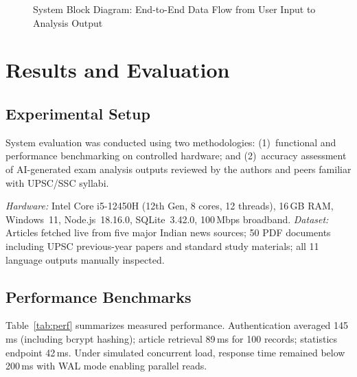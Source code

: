 \documentclass[conference]{IEEEtran}
\begin{document}
\begin{figure}[!t]
\caption{System Block Diagram: End-to-End Data Flow from User Input to Analysis Output}
\label{fig:blockdiagram}
\end{figure}

\section{Results and Evaluation}

\subsection{Experimental Setup}
System evaluation was conducted using two methodologies: (1)~functional and performance benchmarking on controlled hardware; and (2)~accuracy assessment of AI-generated exam analysis outputs reviewed by the authors and peers familiar with UPSC/SSC syllabi.

\textit{Hardware:} Intel Core i5-12450H (12th Gen, 8 cores, 12 threads), 16\,GB RAM, Windows~11, Node.js~18.16.0, SQLite~3.42.0, 100\,Mbps broadband. \textit{Dataset:} Articles fetched live from five major Indian news sources; 50 PDF documents including UPSC previous-year papers and standard study materials; all 11 language outputs manually inspected.

\subsection{Performance Benchmarks}
Table~\ref{tab:perf} summarizes measured performance. Authentication averaged 145\,ms (including bcrypt hashing); article retrieval 89\,ms for 100 records; statistics endpoint 42\,ms. Under simulated concurrent load, response time remained below 200\,ms with WAL mode enabling parallel reads.
\end{document}
